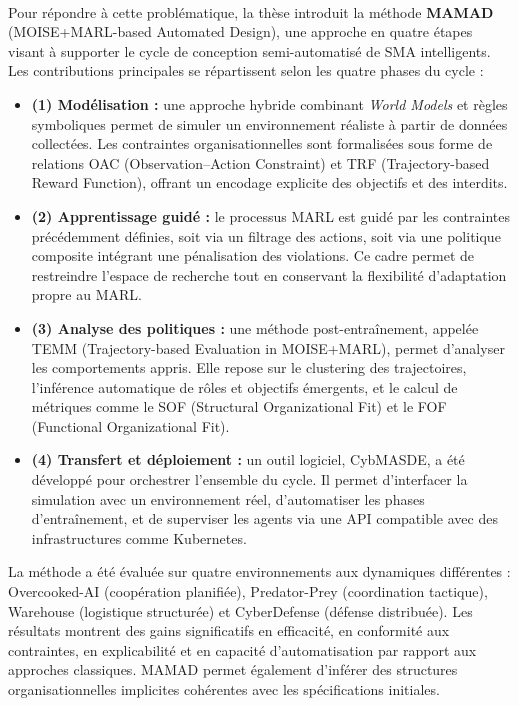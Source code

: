 \bigskip

\\

\noindent
Pour répondre à cette problématique, la thèse introduit la méthode \textbf{MAMAD} (MOISE+MARL-based Automated Design), une approche en quatre étapes visant à supporter le cycle de conception semi-automatisé de SMA intelligents. Les contributions principales se répartissent selon les quatre phases du cycle :

\begin{itemize}
  \item \textbf{(1) Modélisation :} une approche hybride combinant \textit{World Models} et règles symboliques permet de simuler un environnement réaliste à partir de données collectées. Les contraintes organisationnelles sont formalisées sous forme de relations OAC (Observation–Action Constraint) et TRF (Trajectory-based Reward Function), offrant un encodage explicite des objectifs et des interdits.

  \item \textbf{(2) Apprentissage guidé :} le processus MARL est guidé par les contraintes précédemment définies, soit via un filtrage des actions, soit via une politique composite intégrant une pénalisation des violations. Ce cadre permet de restreindre l’espace de recherche tout en conservant la flexibilité d’adaptation propre au MARL.

  \item \textbf{(3) Analyse des politiques :} une méthode post-entraînement, appelée TEMM (Trajectory-based Evaluation in MOISE+MARL), permet d’analyser les comportements appris. Elle repose sur le clustering des trajectoires, l’inférence automatique de rôles et objectifs émergents, et le calcul de métriques comme le SOF (Structural Organizational Fit) et le FOF (Functional Organizational Fit).

  \item \textbf{(4) Transfert et déploiement :} un outil logiciel, CybMASDE, a été développé pour orchestrer l’ensemble du cycle. Il permet d’interfacer la simulation avec un environnement réel, d’automatiser les phases d’entraînement, et de superviser les agents via une API compatible avec des infrastructures comme Kubernetes.
\end{itemize}

La méthode a été évaluée sur quatre environnements aux dynamiques différentes : Overcooked-AI (coopération planifiée), Predator-Prey (coordination tactique), Warehouse (logistique structurée) et CyberDefense (défense distribuée). Les résultats montrent des gains significatifs en efficacité, en conformité aux contraintes, en explicabilité et en capacité d’automatisation par rapport aux approches classiques. MAMAD permet également d’inférer des structures organisationnelles implicites cohérentes avec les spécifications initiales.

